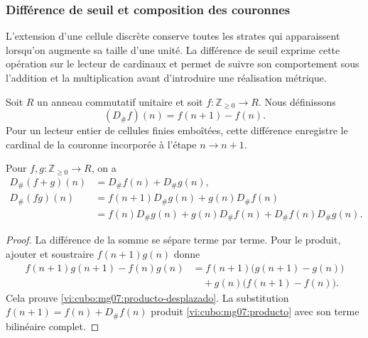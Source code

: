 \subsubsection{Différence de seuil et composition des couronnes}
\label{vi:cubo:mg07:umbral}

L'extension d'une cellule discrète conserve toutes les strates qui
apparaissent lorsqu'on augmente sa taille d'une unité. La différence de seuil
exprime cette opération sur le lecteur de cardinaux et permet de suivre
son comportement sous l'addition et la multiplication avant d'introduire une
réalisation métrique.

\begin{definition}
Soit \(R\) un anneau commutatif unitaire et soit
\(f:\mathbb Z_{\geq0}\to R\). Nous définissons
\begin{equation}
 (D_\#f)(n)=f(n+1)-f(n).
 \label{vi:cubo:mg07:definicion}
\end{equation}
Pour un lecteur entier de cellules finies emboîtées, cette différence
enregistre le cardinal de la couronne incorporée à l'étape \(n\to n+1\).
\end{definition}

\begin{proposition}
Pour \(f,g:\mathbb Z_{\geq0}\to R\), on a
\begin{align}
 D_\#(f+g)(n)&=D_\#f(n)+D_\#g(n),
 \label{vi:cubo:mg07:aditividad}\\
 D_\#(fg)(n)&=f(n+1)D_\#g(n)+g(n)D_\#f(n)
 \label{vi:cubo:mg07:producto-desplazado}\\
 &=f(n)D_\#g(n)+g(n)D_\#f(n)
   +D_\#f(n)D_\#g(n).
 \label{vi:cubo:mg07:producto}
\end{align}
\end{proposition}

\begin{proof}
La différence de la somme se sépare terme par terme. Pour le produit,
ajouter et soustraire \(f(n+1)g(n)\) donne
\[
 \begin{split}
 f(n+1)g(n+1)-f(n)g(n)
 &=f(n+1)\bigl(g(n+1)-g(n)\bigr)\\
 &\quad+g(n)\bigl(f(n+1)-f(n)\bigr).
 \end{split}
\]
Cela prouve \eqref{vi:cubo:mg07:producto-desplazado}. La substitution
\(f(n+1)=f(n)+D_\#f(n)\) produit
\eqref{vi:cubo:mg07:producto} avec son terme bilinéaire complet.
\end{proof}

